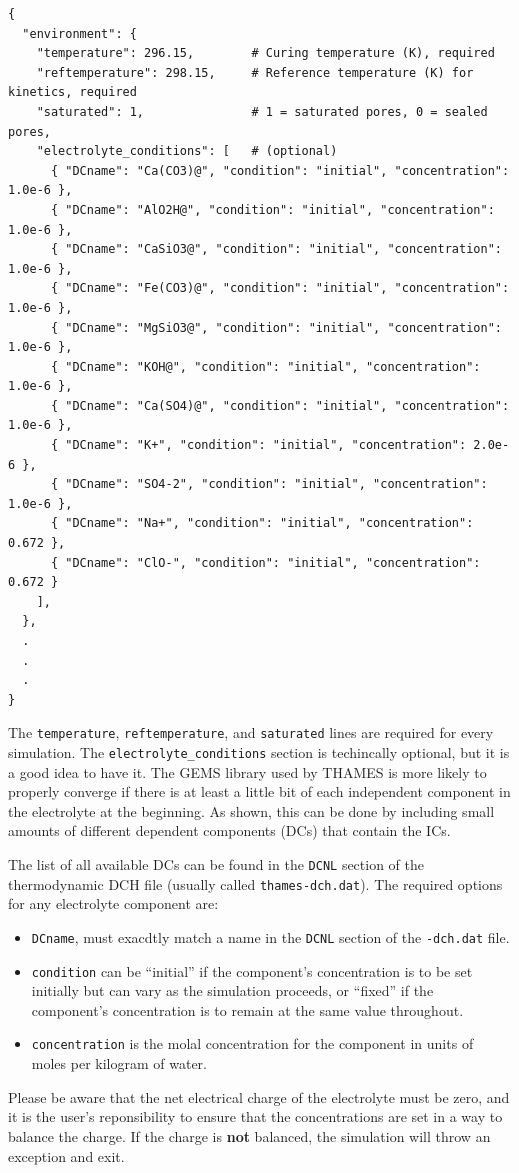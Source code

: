 \documentclass{article}
\begin{document}
\scriptsize{
	\begin{lstlisting}
{
  "environment": {
    "temperature": 296.15,        # Curing temperature (K), required
    "reftemperature": 298.15,     # Reference temperature (K) for kinetics, required
    "saturated": 1,               # 1 = saturated pores, 0 = sealed pores,
    "electrolyte_conditions": [   # (optional)
      { "DCname": "Ca(CO3)@", "condition": "initial", "concentration": 1.0e-6 },
      { "DCname": "AlO2H@", "condition": "initial", "concentration": 1.0e-6 },
      { "DCname": "CaSiO3@", "condition": "initial", "concentration": 1.0e-6 },
      { "DCname": "Fe(CO3)@", "condition": "initial", "concentration": 1.0e-6 },
      { "DCname": "MgSiO3@", "condition": "initial", "concentration": 1.0e-6 },
      { "DCname": "KOH@", "condition": "initial", "concentration": 1.0e-6 },
      { "DCname": "Ca(SO4)@", "condition": "initial", "concentration": 1.0e-6 },
      { "DCname": "K+", "condition": "initial", "concentration": 2.0e-6 },
      { "DCname": "SO4-2", "condition": "initial", "concentration": 1.0e-6 },
      { "DCname": "Na+", "condition": "initial", "concentration": 0.672 },
      { "DCname": "ClO-", "condition": "initial", "concentration": 0.672 }
    ],
  },
  .
  .
  .
}
\end{lstlisting}
}

\normalsize{ }
The \verb!temperature!, \verb!reftemperature!, and \verb!saturated! lines
are required for every simulation. The \verb!electrolyte_conditions! section
is techincally optional, but it is a good idea to have it. The GEMS library
used by THAMES is more likely to properly converge if there is at least a little
bit of each independent component in the electrolyte at the beginning. As shown,
this can be done by including small amounts of different dependent components
(DCs) that contain the ICs.

The list of all available DCs can be found in the \verb!DCNL! section of the
thermodynamic DCH file (usually called \verb!thames-dch.dat!).
The required options for any electrolyte component are:
\begin{itemize}
	\item \verb!DCname!, must exacdtly match a name in the \verb!DCNL! section
	      of the \verb!-dch.dat! file.
	\item \verb!condition! can be ``initial'' if the component's concentration
	      is to be set initially but can vary as the simulation proceeds, or ``fixed''
	      if the component's concentration is to remain at the same value throughout.
	\item \verb!concentration! is the molal concentration for the component in
	      units of moles per kilogram of water.
\end{itemize}
Please be aware that the net electrical charge of the electrolyte must
be zero, and it is the user's reponsibility to ensure that the concentrations
are set in a way to balance the charge. If the charge is \textbf{not} balanced,
the simulation will throw an exception and exit.
\end{document}
